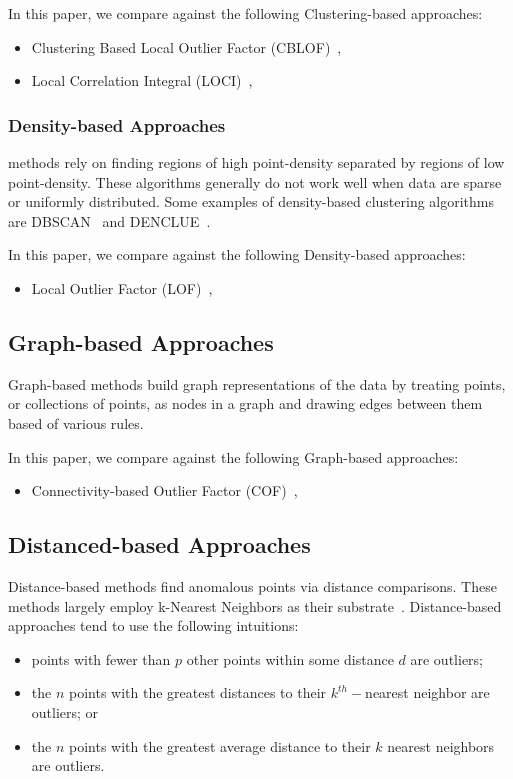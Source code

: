 In this paper, we compare against the following Clustering-based approaches:
\begin{itemize}
    \item Clustering Based Local Outlier Factor (CBLOF)~\cite{he2003cblof},
    \item Local Correlation Integral (LOCI)~\cite{papadimitriou2003loci},
\end{itemize}


\subsubsection{Density-based Approaches}
\label{subsec:introduction:density-based-approaches}
methods rely on finding regions of high point-density separated by regions of low point-density.
These algorithms generally do not work well when data are sparse or uniformly distributed.
Some examples of density-based clustering algorithms are
DBSCAN~\cite{ester1996density} and
DENCLUE~\cite{hinneburg1998efficient}.

In this paper, we compare against the following Density-based approaches:
\begin{itemize}
    \item Local Outlier Factor (LOF)~\cite{breunig2000lof},
\end{itemize}


\subsection{Graph-based Approaches}
\label{subsec:introduction:graph-based-approaches}

Graph-based methods build graph representations of the data by treating points, or collections of points, as nodes in a graph and drawing edges between them based of various rules.

In this paper, we compare against the following Graph-based approaches:
\begin{itemize}
    \item Connectivity-based Outlier Factor (COF)~\cite{tang2002cof},
\end{itemize}


\subsection{Distanced-based Approaches}
\label{subsec:related-works:distanced-based-approaches}

Distance-based methods find anomalous points via distance comparisons.
These methods largely employ k-Nearest Neighbors as their substrate~\cite{wang2019progress}.
Distance-based approaches tend to use the following intuitions:
\begin{itemize}
    \item points with fewer than $p$ other points within some distance $d$ are outliers;
    \item the $n$ points with the greatest distances to their $k^{th}-$nearest neighbor are outliers; or
    \item the $n$ points with the greatest average distance to their $k$ nearest neighbors are outliers.
\end{itemize}

